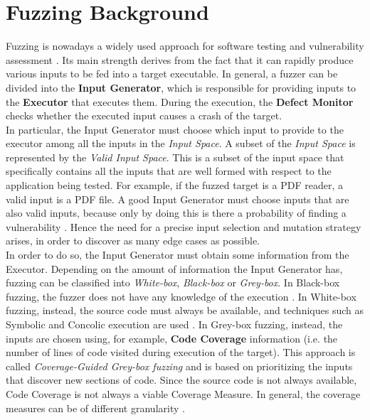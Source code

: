 \section{Fuzzing Background} \label{sec:fuzz_background}
    Fuzzing is nowadays a widely used approach for software testing and vulnerability assessment \cite{Zhu2022,Mallissery2023}.
    Its main strength derives from the fact that it can rapidly produce various inputs to be fed into a target executable.
    In general, a fuzzer can be divided into the \textbf{Input Generator}, which is responsible for providing inputs to the \textbf{Executor} that executes them.
    During the execution, the \textbf{Defect Monitor} checks whether the executed input causes a crash of the target.\\
    In particular, the Input Generator must choose which input to provide to the executor among all the inputs in the \textit{Input Space}.
    A subset of the \textit{Input Space} is represented by the \textit{Valid Input Space}.
    This is a subset of the input space that specifically contains all the inputs that are well formed with respect to the
    application being tested.
    For example, if the fuzzed target is a PDF reader, a valid input is a PDF file.
    A good Input Generator must choose inputs that are also valid inputs, because only by doing this is there a probability of finding a vulnerability \cite{Zhu2022}.
    Hence the need for a precise input selection and mutation strategy arises, in order to discover as many edge cases as possible.\\
    In order to do so, the Input Generator must obtain some information from the Executor.
    Depending on the amount of information the Input Generator has, fuzzing can be classified into
    \textit{White-box}, \textit{Black-box} or \textit{Grey-box}.
    In Black-box fuzzing, the fuzzer does not have any knowledge of the execution \cite{Miller1990}.
    In White-box fuzzing, instead, the source code must always be available, and techniques such as Symbolic and Concolic execution are used \cite{Godefroid2012}.
    In Grey-box fuzzing, instead, the inputs are chosen using, for example, \textbf{Code Coverage} information (i.e. the number of lines of code visited during execution of the target).
    This approach is called \textit{Coverage-Guided Grey-box fuzzing} and is based on prioritizing the inputs that discover new sections of code.
    Since the source code is not always available, Code Coverage is not always a viable Coverage Measure.
    In general, the coverage measures can be of different granularity \cite{CollAFL}.
